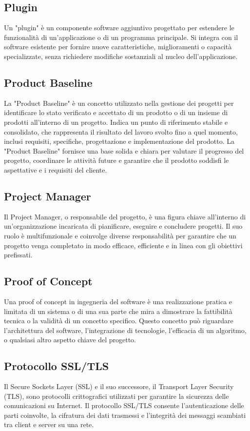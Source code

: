 \documentclass{article}
\begin{document}
\subsection{Plugin}
Un "plugin" è un componente software aggiuntivo progettato per estendere le funzionalità di un'applicazione o di un programma principale. Si integra con il software esistente per fornire nuove caratteristiche, miglioramenti o capacità specializzate, senza richiedere modifiche sostanziali al nucleo dell'applicazione. 

\subsection{Product Baseline}
La "Product Baseline" è un concetto utilizzato nella gestione dei progetti per identificare lo stato verificato e accettato di un prodotto o di un insieme di prodotti all'interno di un progetto. Indica un punto di riferimento stabile e consolidato, che rappresenta il risultato del lavoro svolto fino a quel momento, inclusi requisiti, specifiche, progettazione e implementazione del prodotto. La "Product Baseline" fornisce una base solida e chiara per valutare il progresso del progetto, coordinare le attività future e garantire che il prodotto soddisfi le aspettative e i requisiti del cliente.

\subsection{Project Manager}
Il Project Manager, o responsabile del progetto, è una figura chiave all'interno di un'organizzazione incaricata di pianificare, eseguire e concludere progetti. Il suo ruolo è multifunzionale e coinvolge diverse responsabilità per garantire che un progetto venga completato in modo efficace, efficiente e in linea con gli obiettivi prefissati.

\subsection{Proof of Concept}
Una proof of concept in ingegneria del software è una realizzazione pratica e limitata di un sistema o di una sua parte che mira a dimostrare la fattibilità tecnica o la validità di un concetto specifico. Questo concetto può riguardare l'architettura del software, l'integrazione di tecnologie, l'efficacia di un algoritmo, o qualsiasi altro aspetto chiave del progetto.

\subsection{Protocollo SSL/TLS}
Il Secure Sockets Layer (SSL) e il suo successore, il Transport Layer Security (TLS), sono protocolli crittografici utilizzati per garantire la sicurezza delle comunicazioni su Internet. Il protocollo SSL/TLS consente l'autenticazione delle parti coinvolte, la cifratura dei dati trasmessi e l'integrità dei messaggi scambiati tra client e server su una rete.
\end{document}
